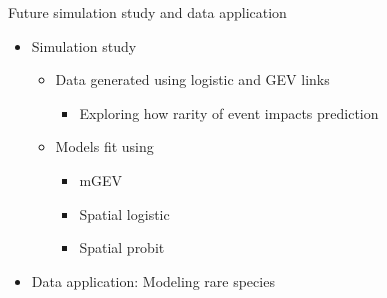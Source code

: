\documentclass{beamer}
\begin{document}
\begin{frame}{Future simulation study and data application}
  \begin{itemize} \setlength{\itemsep}{1em}
    \item Simulation study \vspace{0.5em}
    \begin{itemize} \setlength{\itemsep}{0.5em}
      \item Data generated using logistic and GEV links \vspace{0.25em}
      \begin{itemize}
        \item Exploring how rarity of event impacts prediction
      \end{itemize}
      \item Models fit using \vspace{0.25em}
      \begin{itemize} \setlength{\itemsep}{0.25em}
        \item mGEV
        \item Spatial logistic
        \item Spatial probit
      \end{itemize}
    \end{itemize}
    \item Data application: Modeling rare species \vspace{0.5em}
  \end{itemize}
\end{frame}


\end{document}
